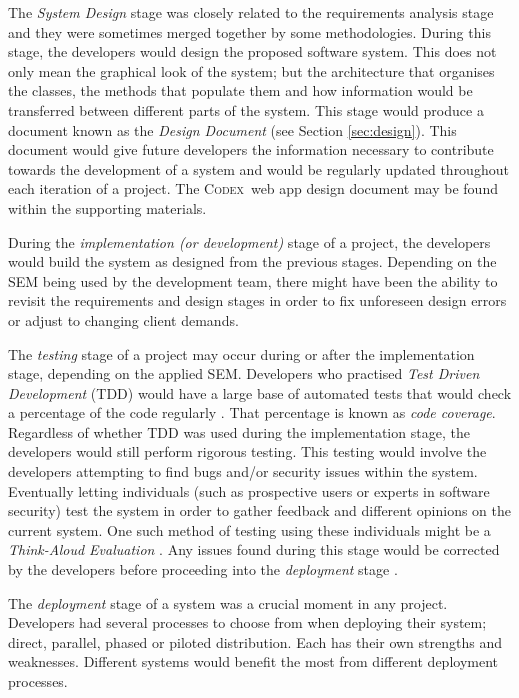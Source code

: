 \documentclass[final]{cmpreport}
\newcommand{\Codex}{\textsc{Codex}}
\begin{document}
			The \emph{System Design} stage was closely related to the requirements analysis stage and they were sometimes merged together by some methodologies. During this stage, the developers would design the proposed software system. This does not only mean the graphical look of the system; but the architecture that organises the classes, the methods that populate them and how information would be transferred between different parts of the system. This stage would produce a document known as the \emph{Design Document} (see Section \ref{sec:design}). This document would give future developers the information necessary to contribute towards the development of a system and would be regularly updated throughout each iteration of a project. The \Codex \ web app design document may be found within the supporting materials.
			
			During the \emph{implementation (or development)} stage of a project, the developers would build the system as designed from the previous stages. Depending on the SEM being used by the development team, there might have been the ability to revisit the requirements and design stages in order to fix unforeseen design errors or adjust to changing client demands. 
			
			The \emph{testing} stage of a project may occur during or after the implementation stage, depending on the applied SEM. Developers who practised \emph{Test Driven Development} (TDD) would have a large base of automated tests that would check a percentage of the code regularly \citep{TDD}. That percentage is known as \emph{code coverage}. Regardless of whether TDD was used during the implementation stage, the developers would still perform rigorous testing. This testing would involve the developers attempting to find bugs and/or security issues within the system. Eventually letting individuals (such as prospective users or experts in software security) test the system in order to gather feedback and different opinions on the current system. One such method of testing using these individuals might be a \emph{Think-Aloud Evaluation} \citep{thinkaloud}. Any issues found during this stage would be corrected by the developers before proceeding into the \textit{deployment} stage \citep{testing}.
			
			The \emph{deployment} stage of a system was a crucial moment in any project. Developers had several processes to choose from when deploying their system; direct, parallel, phased or piloted distribution. Each has their own strengths and weaknesses. Different systems would benefit the most from different deployment processes. 
			
\end{document}
